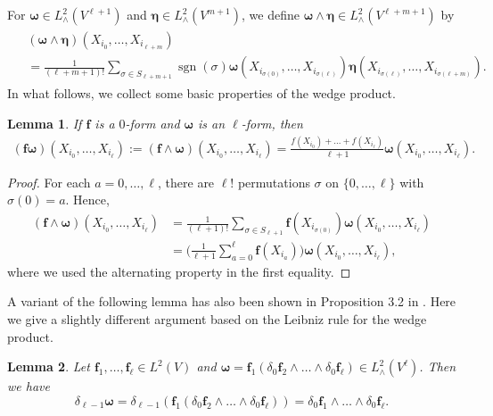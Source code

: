 \documentclass[10pt]{article}
\theoremstyle{plain}
\newtheorem{lemma}{Lemma}
\theoremstyle{definition}
\theoremstyle{remark}
\begin{document}
    For $\boldsymbol{\omega}\in L^2_\wedge(V^{\ell+1})$ and $\boldsymbol{\eta}\in L^2_\wedge(V^{m+1})$, we define $\boldsymbol{\omega}\wedge \boldsymbol{\eta}\in L^2_\wedge(V^{\ell+m+1})$ by 
    \begin{align} \label{eq:def:wedgeProduct}
        \begin{split}
        &(\boldsymbol{\omega}\wedge \boldsymbol{\eta})(X_{i_0},\dots, X_{i_{\ell+m}})\\
        &=\frac{1}{(\ell+m+1)!}\sum_{\sigma\in S_{\ell+m+1}}\operatorname{sgn}(\sigma)\boldsymbol{\omega}(X_{i_{\sigma(0)}},\dots, X_{i_{\sigma(\ell)}})\boldsymbol{\eta}(X_{i_{\sigma(\ell)}},\dots, X_{i_{\sigma(\ell+m)}}).
        \end{split}
    \end{align}
    In what follows, we collect some basic properties of the wedge product.

    \begin{lemma} If $\mathbf{f}$ is a $0$-form and $\boldsymbol{\omega}$ is an $\ell$-form, then 
    \begin{align*}
        (\mathbf{f} \boldsymbol{\omega})(X_{i_0},\dots, X_{i_{\ell}}):=(\mathbf{f}\wedge \boldsymbol{\omega})(X_{i_0},\dots, X_{i_{\ell}})=\frac{f(X_{i_0})+\dots +f(X_{i_\ell})}{\ell+1}\boldsymbol{\omega}(X_{i_0},\dots, X_{i_{\ell}}).
    \end{align*}
    \end{lemma}

    \begin{proof}
        For each $a=0,\dots,\ell$, there are $\ell!$ permutations $\sigma$ on $\{0,\dots,\ell\}$ with $\sigma(0)=a$. Hence,
        \begin{align*}
            (\mathbf{f}\wedge \boldsymbol{\omega})(X_{i_0},\dots, X_{i_{\ell}})&=\frac{1}{(\ell+1)!}\sum_{\sigma\in S_{\ell+1}}\mathbf{f}(X_{i_{\sigma(0)}})\boldsymbol{\omega}(X_{i_{0}},\dots, X_{i_{\ell}})\\
            &=\Big(\frac{1}{\ell+1}\sum_{a=0}^\ell \mathbf{f}(X_{i_a})\Big)\boldsymbol{\omega}(X_{i_{0}},\dots, X_{i_{\ell}}),
        \end{align*}
        where we used the alternating property in the first equality.
    \end{proof}

    A variant of the following lemma has also been shown in Proposition 3.2 in \cite{HK24}. Here we give a slightly different argument based on the Leibniz rule for the wedge product.

    \begin{lemma}\label{lemma:derivative:empirical:l:form}
        Let $\mathbf{f}_1,\dots,\mathbf{f}_\ell\in L^2(V)$ and $\boldsymbol{\omega}=\mathbf{f}_1(\delta_0\mathbf{f}_2\wedge\dots\wedge \delta_0\mathbf{f}_\ell)\in L_\wedge^2(V^\ell)$. Then we have 
        \[ \delta_{\ell-1}\boldsymbol{\omega}=\delta_{\ell-1} \left( \mathbf{f}_1(\delta_0\mathbf{f}_2\wedge\dots\wedge \delta_0\mathbf{f}_\ell)\right) =\delta_0\mathbf{f}_1\wedge\dots\wedge \delta_0\mathbf{f}_\ell.\]
    \end{lemma}
\end{document}
